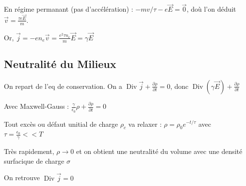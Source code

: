 \documentclass[french]{yLectureNote}
\renewcommand{\vec}{\overrightarrow}
\DeclareMathOperator{\Div}{Div}
\begin{document}
En régime permanant (pas d'accélération) : $-mv/\tau - e\vec{E} = \vec{0}$, doù l'on déduit
$\vec{v} = \frac{\tau e\vec{E}}{m}$.

Or, $\vec{j} = -en_e \vec{v} = \frac{e^2 \tau n_e}{m}\vec{E} = \gamma \vec{E}$

\subsection{Neutralité du Milieux}
On repart de l'eq de conservation. 
On a $\Div \vec{j}+\frac{\partial \rho}{\partial t} = 0$, donc $\Div (\gamma \vec{E}) + \frac{\partial \rho}{\partial t}$

Avec Maxwell-Gauss : $\frac{\gamma}{\epsilon_0}\rho + \frac{\partial \rho}{\partial t} = 0$

Tout excès ou défaut unitial de charge $\rho_c$ va relaxer : $\rho = \rho_0 e^{-t/\tau}$ avec $\tau = \frac{\epsilon_0}{\gamma}<< T$

Très rapidement, $\rho\to 0$ et on obtient une neutralité du volume  avec une densité surfacique de charge $\sigma$

On retrouve $\Div \vec{j} = 0$
\end{document}
